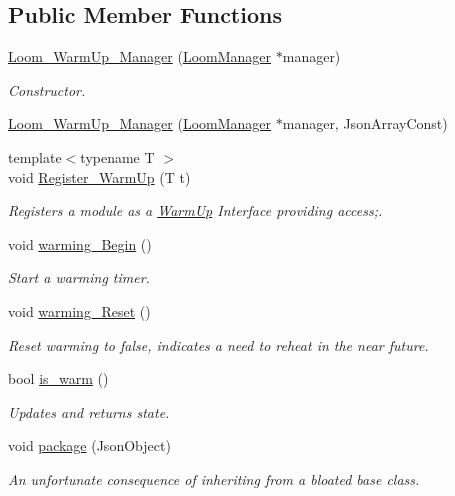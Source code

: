 \subsection*{Public Member Functions}
\begin{DoxyCompactItemize}
\item 
\hyperlink{class_loom___warm_up___manager_a7e641d24fca0655a17ed0dbefa0fc36f}{Loom\+\_\+\+Warm\+Up\+\_\+\+Manager} (\hyperlink{class_loom_manager}{Loom\+Manager} $\ast$manager)
\begin{DoxyCompactList}\small\item\em Constructor. \end{DoxyCompactList}\item 
\hyperlink{class_loom___warm_up___manager_a3172f20e2fdf7b389f7756b9af8b8d80}{Loom\+\_\+\+Warm\+Up\+\_\+\+Manager} (\hyperlink{class_loom_manager}{Loom\+Manager} $\ast$manager, Json\+Array\+Const)
\item 
{\footnotesize template$<$typename T $>$ }\\void \hyperlink{class_loom___warm_up___manager_aaff8ae9623bc53aef94e91e015c6625e}{Register\+\_\+\+Warm\+Up} (T t)
\begin{DoxyCompactList}\small\item\em Registers a module as a \hyperlink{class_warm_up}{Warm\+Up} Interface providing access;. \end{DoxyCompactList}\item 
void \hyperlink{class_loom___warm_up___manager_ae98e975506dfe72122385e2bc6863ed8}{warming\+\_\+\+Begin} ()
\begin{DoxyCompactList}\small\item\em Start a warming timer. \end{DoxyCompactList}\item 
void \hyperlink{class_loom___warm_up___manager_a321968f0ffddad8a8a2e2a138c35ba9f}{warming\+\_\+\+Reset} ()
\begin{DoxyCompactList}\small\item\em Reset warming to false, indicates a need to reheat in the near future. \end{DoxyCompactList}\item 
bool \hyperlink{class_loom___warm_up___manager_a9932619f9896bbdc06eb7256a231ce13}{is\+\_\+warm} ()
\begin{DoxyCompactList}\small\item\em Updates and returns state. \end{DoxyCompactList}\item 
void \hyperlink{class_loom___warm_up___manager_a82c8cd30f969a681a76b332d3b1c2ce4}{package} (Json\+Object)
\begin{DoxyCompactList}\small\item\em An unfortunate consequence of inheriting from a bloated base class. \end{DoxyCompactList}\end{DoxyCompactItemize}
